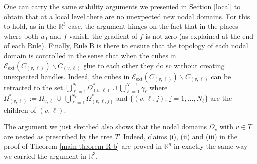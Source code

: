 \documentclass[11pt,reqno]{amsart}
\newcommand{\R}{{\mathbb R}}
\theoremstyle{definition}
\begin{document}
One can carry the same stability arguments we presented in Section \ref{local} to obtain that at a local level there are no unexpected new nodal domains. For this to hold, as in the $\R^3$ case, the argument hinges on the fact that in the places where both $u_0$ and $f$ vanish, the gradient of $f$ is not zero (as explained at the end of each Rule).  Finally, Rule B is there to ensure that the topology of each nodal domain is controlled in the sense that when the cubes in $\mathcal E_{\text{ext}}(C_{(v, \ell)})\backslash C_{(v,\ell)}$  glue to each other  they do so without  creating unexpected handles. Indeed, the cubes in  $\mathcal E_{\text{ext}}(C_{(v, \ell)})\backslash C_{(v,\ell)}$ can be retracted to the set $\bigcup_{\ell=1}^N \Omega_{(v,\ell)}^* \cup \bigcup_{\ell=1}^{N-1}\gamma_\ell$ where $\Omega_{(v,\ell)}^*:= \overline{\Omega_{v, \ell}}\, \cup\, \bigcup_{\ell=1}^{N_\ell} \Omega_{(v,\ell, j)}^*$ and $\{(v, \ell, j):\, j=1,\dots, N_\ell\}$ are the children of $(v, \ell)$.

The argument we just sketched also shows that  the nodal domains $\Omega_v$ with $v \in T$ are nested as prescribed by the tree $T$. Indeed, claims (i), (ii) and (iii) in the proof of Theorem \ref{main theorem R b} are proved in $\R^n$ in exactly the same way we carried the argument in $\R^3$. 



\end{document}
